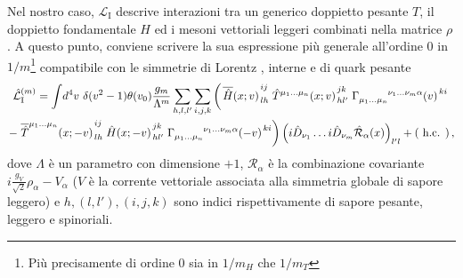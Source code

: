 \documentclass{article}
\newcommand{\adj}[1]{\overline{#1}}
\begin{document}
Nel nostro caso, $\mathcal{L}_\text{I}$ descrive interazioni tra un generico doppietto pesante $T$, il doppietto fondamentale $H$ ed i mesoni vettoriali leggeri combinati nella matrice $\rho$. A questo punto, conviene scrivere la sua espressione più generale all'ordine $0$ in $1/m$\footnote{Più precisamente di ordine $0$ sia in $1/m_H$ che $1/m_T$} compatibile con le simmetrie di Lorentz\footnotemark{} \cite{article:Georgi}, interne e di quark pesante
\begin{multline}
  \hat{\mathcal{L}}^{(m)}_\text{I} = \int \! \mathop{d^4 v} \, \delta(v^2 -1) \theta(v_0) \frac{g_m}{\Lambda^m} \sum_{h,l,l'} \sum_{i,j,k} \left( \left. \adj{\hat{H}}(x; v) \right.^{i j}_{l h}  \left. \hat{T}^{\mu_1 \dots \mu_n}(x; v) \right.^{j k}_{h l'} \left. \Gamma\indices{_{\mu_1 \dots \mu_n}^{\nu_1 \dots \nu_m \alpha}}(v) \right.^{k i} \right. \\ \left. - \left. \adj{\hat{T}}^{\mu_1 \dots \mu_n}(x; -v) \right.^{i j}_{l h} \left. \hat{H}(x; -v) \right.^{j k}_{h l'} \left. \Gamma\indices{_{\mu_1 \dots \mu_n}^{\nu_1 \dots \nu_m \alpha}}(-v) \right.^{k i} \right) \left( i \hat{D}_{\nu_1} \dots i \hat{D}_{\nu_m} \hat{\mathcal{R}}_\alpha(x) \right)_{l' l} + (\text{ h.c. }) \, ,
  \label{eq:most_general_int_lagrangian}
\end{multline}
dove $\Lambda$ è un parametro con dimensione $+1$, $\mathcal{R}_\alpha$ è la combinazione covariante $i \frac{g_V}{\sqrt{2}} \rho_\alpha - V_\alpha$ ($V$ è la corrente vettoriale associata alla simmetria globale di sapore leggero) e $h, (l,l'), (i,j,k)$ sono indici rispettivamente di sapore pesante, leggero e spinoriali. 
\end{document}
